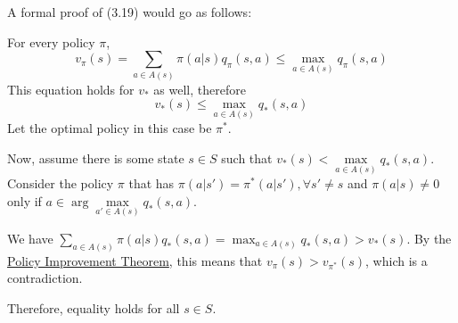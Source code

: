 \documentclass[12pt]{report}
\begin{document}
A formal proof of (3.19) would go as follows:

For every policy $\pi$,
\begin{equation}
    v_{\pi}(s) = \sum_{a \in A(s)} \pi(a | s) q_{\pi}(s, a) \leq \max_{a \in A(s)} q_{\pi}(s, a)
\end{equation}
This equation holds for $v_{*}$ as well, therefore 
\begin{equation}
    v_{*}(s) \leq \max_{a \in A(s)} q_{*}(s, a)
\end{equation}
Let the optimal policy in this case be $\pi^{*}$.

Now, assume there is some state $s \in S$ such that $v_{*}(s) < \max\limits_{a \in A(s)} q_{*}(s, a)$. Consider the policy $\pi$ that has $\pi(a | s') = \pi^{*}(a | s'), \forall s' \neq s$ and $\pi(a | s) \neq 0$ only if $a \in \arg\max\limits_{a' \in A(s)} q_{*}(s, a)$.

We have $\sum\limits_{a \in A(s)} \pi(a | s) q_{*}(s, a) = \max_{a \in A(s)} q_{*}(s, a) > v_{*}(s)$. By the \hyperref[subsec:PIT]{Policy Improvement Theorem}, this means that $v_{\pi}(s) > v_{\pi^{*}}(s)$, which is a contradiction.

Therefore, equality holds for all $s \in S$.

\end{document}
